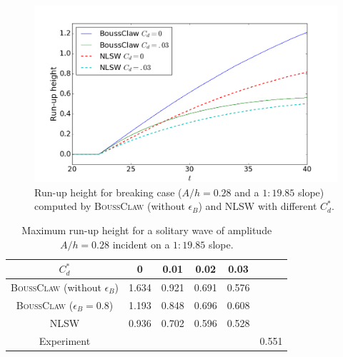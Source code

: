 \documentclass[review]{elsarticle}
\newcommand{\BoussClaw}{\textsc{BoussClaw} }
\begin{document}
\begin{figure}[!htb]
	\centering
			\includegraphics[width=.8\textwidth]{_fig/runup_slope_1_20}
		\caption{Run-up height for breaking case ($A/h=0.28$ and a $1:19.85$ slope) computed by \BoussClaw 
			(without $\epsilon_B$) and NLSW with different $C_d^*$.}
		\label{fig:runup_slope_1_20}
\end{figure}

\begin{table}
		\begin{tabular}{cccccc} \hline
			           $C_d^*$ & 0 & 0.01 & 0.02 & 0.03 &  \\ \hline
			\BoussClaw (without $\epsilon_B$)& 1.634 & 0.921 & 0.691 & 0.576  &  \\ 
			\BoussClaw ($\epsilon_B=0.8$)& 1.193 & 0.848 & 0.696 & 0.608 &  \\
			NLSW & 0.936 & 0.702 & 0.596 & 0.528 &  \\
			\hline
			Experiment  & & & & & 0.551 \\
			\hline
		\end{tabular}
	\caption{Maximum run-up height for a solitary wave of amplitude $A/h=0.28$ incident on  a $1:19.85$ slope.}%
	\label{tab:max_runup_1_20}
\end{table}



\end{document}
